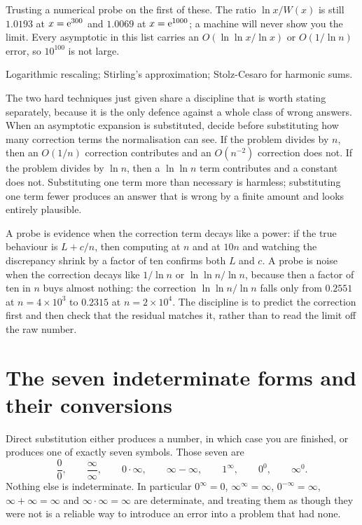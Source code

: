 \begin{trap}
Trusting a numerical probe on the first of these. The ratio $\ln x/W(x)$ is still $1.0193$ at $x=\mathrm{e}^{300}$ and $1.0069$ at $x=\mathrm{e}^{1000}$; a machine will never show you the limit. Every asymptotic in this list carries an $O(\ln\ln x/\ln x)$ or $O(1/\ln n)$ error, so $10^{100}$ is not large.
\end{trap}

\begin{seealsob}Logarithmic rescaling; Stirling's approximation; Stolz-Cesaro for harmonic sums.\end{seealsob}

The two hard techniques just given share a discipline that is worth stating separately, because it is the only defence against a whole class of wrong answers. When an asymptotic expansion is substituted, decide before substituting how many correction terms the normalisation can see. If the problem divides by $n$, then an $O(1/n)$ correction contributes and an $O(n^{-2})$ correction does not. If the problem divides by $\ln n$, then a $\ln\ln n$ term contributes and a constant does not. Substituting one term more than necessary is harmless; substituting one term fewer produces an answer that is wrong by a finite amount and looks entirely plausible.

\begin{keynote}
A probe is evidence when the correction term decays like a power: if the true behaviour is $L+c/n$, then computing at $n$ and at $10n$ and watching the discrepancy shrink by a factor of ten confirms both $L$ and $c$. A probe is noise when the correction decays like $1/\ln n$ or $\ln\ln n/\ln n$, because then a factor of ten in $n$ buys almost nothing: the correction $\ln\ln n/\ln n$ falls only from $0.2551$ at $n=4\times10^{3}$ to $0.2315$ at $n=2\times10^{4}$. The discipline is to predict the correction first and then check that the residual matches it, rather than to read the limit off the raw number.
\end{keynote}

\section{The seven indeterminate forms and their conversions}

Direct substitution either produces a number, in which case you are finished, or produces one of exactly seven symbols. Those seven are
\[
\frac00,\qquad \frac{\infty}{\infty},\qquad 0\cdot\infty,\qquad \infty-\infty,\qquad 1^{\infty},\qquad 0^{0},\qquad \infty^{0}.
\]
Nothing else is indeterminate. In particular $0^{\infty}=0$, $\infty^{\infty}=\infty$, $0^{-\infty}=\infty$, $\infty+\infty=\infty$ and $\infty\cdot\infty=\infty$ are determinate, and treating them as though they were not is a reliable way to introduce an error into a problem that had none.

